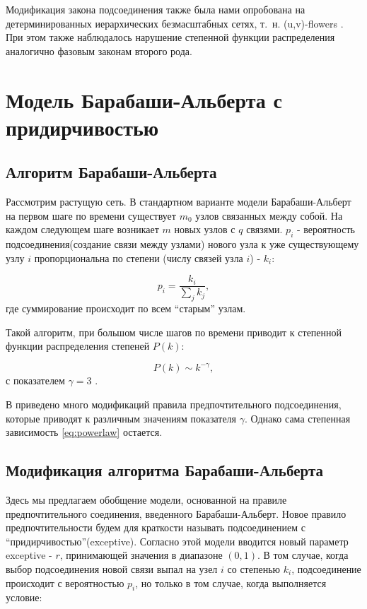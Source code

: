 \documentclass[10pt,aps,pra]{revtex4-1}
\begin{document}
    Модификация закона подсоединения также была нами опробована на детерминированных иерархических безмасштабных сетях, т. н. (u,v)-flowers \cite{Dor1}. При этом также наблюдалось нарушение степенной функции распределения аналогично фазовым законам второго рода.

\section{Модель Барабаши-Альберта с придирчивостью}

    \subsection{Алгоритм Барабаши-Альберта}

        Рассмотрим растущую сеть. В стандартном варианте модели Барабаши-Альберт \cite{AlBa1} на первом шаге по времени существует $m_0$ узлов связанных между собой. На каждом следующем шаге возникает $m$ новых узлов с $q$ связями. $p_i$ - вероятность подсоединения(создание связи между узлами) нового узла к уже существующему узлу $i$ пропорциональна по степени (числу связей узла $i$) - $k_i$:

            \begin{equation}
                p_i = \frac{k_i}{\sum\limits_{j} k_j},
            \end{equation}
                где суммирование происходит по всем “старым” узлам.

        Такой алгоритм, при большом числе шагов по времени приводит к степенной функции распределения степеней $P(k)$:

            \begin{equation}\label{eq:powerlaw}
                P(k) \sim k^{-\gamma},
            \end{equation}
                с показателем $\gamma =3$ \cite{AlBa1}.

        В \cite{AlBa2} приведено много модификаций правила предпочтительного подсоединения, которые приводят к различным значениям показателя $\gamma$. Однако сама степенная зависимость \eqref{eq:powerlaw} остается.

    \subsection{Модификация алгоритма Барабаши-Альберта}

        Здесь мы предлагаем обобщение модели, основанной на правиле предпочтительного соединения, введенного Барабаши-Альберт. Новое правило предпочтительности будем для краткости называть подсоединением с ``придирчивостью''(exceptive). Согласно этой модели вводится новый параметр exceptive - $r$, принимающей значения в диапазоне $(0, 1)$. В том случае, когда выбор подсоединения новой связи выпал на узел $i$ со степенью $k_i$, подсоединение происходит с вероятностью $p_i$, но только в том случае, когда выполняется условие:
\end{document}

